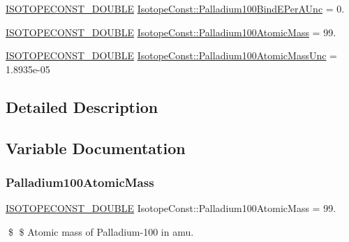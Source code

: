 \begin{DoxyCompactItemize}
\mbox{\hyperlink{group___isotope_const-_macros_ga8f45a7272ce02c0b4c65c44636ed719a}{I\+S\+O\+T\+O\+P\+E\+C\+O\+N\+S\+T\+\_\+\+D\+O\+U\+B\+LE}} \mbox{\hyperlink{group___isotope_const-_palladium-_pd100_gaa8d86b9786e80c522478b02106c0b611}{Isotope\+Const\+::\+Palladium100\+Bind\+E\+Per\+A\+Unc}} = 0.
\item 
\mbox{\hyperlink{group___isotope_const-_macros_ga8f45a7272ce02c0b4c65c44636ed719a}{I\+S\+O\+T\+O\+P\+E\+C\+O\+N\+S\+T\+\_\+\+D\+O\+U\+B\+LE}} \mbox{\hyperlink{group___isotope_const-_palladium-_pd100_gae5053ea966c1bd20593b7298288d93f1}{Isotope\+Const\+::\+Palladium100\+Atomic\+Mass}} = 99.
\item 
\mbox{\hyperlink{group___isotope_const-_macros_ga8f45a7272ce02c0b4c65c44636ed719a}{I\+S\+O\+T\+O\+P\+E\+C\+O\+N\+S\+T\+\_\+\+D\+O\+U\+B\+LE}} \mbox{\hyperlink{group___isotope_const-_palladium-_pd100_gae65d237013143fae24371b24303336a8}{Isotope\+Const\+::\+Palladium100\+Atomic\+Mass\+Unc}} = 1.\+8935e-\/05
\end{DoxyCompactItemize}


\subsection{Detailed Description}


\subsection{Variable Documentation}
\mbox{\label{group___isotope_const-_palladium-_pd100_gae5053ea966c1bd20593b7298288d93f1}} 
\subsubsection{\texorpdfstring{Palladium100\+Atomic\+Mass}{Palladium100AtomicMass}}
{\footnotesize\ttfamily \mbox{\hyperlink{group___isotope_const-_macros_ga8f45a7272ce02c0b4c65c44636ed719a}{I\+S\+O\+T\+O\+P\+E\+C\+O\+N\+S\+T\+\_\+\+D\+O\+U\+B\+LE}} Isotope\+Const\+::\+Palladium100\+Atomic\+Mass = 99.}

\$ \$ Atomic mass of Palladium-\/100 in amu. \mbox{\label{group___isotope_const-_palladium-_pd100_gae65d237013143fae24371b24303336a8}} 
